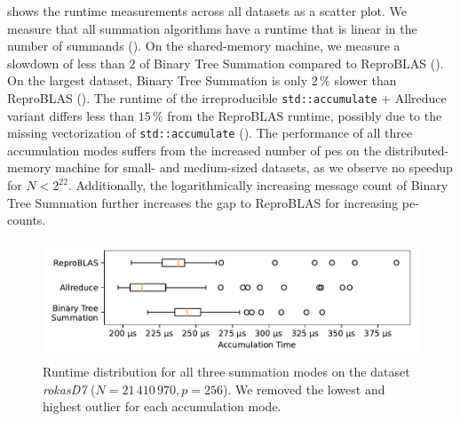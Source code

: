  shows the runtime measurements across all datasets as a scatter plot.
We measure that all summation algorithms have a runtime that is linear in the number of summands ().
On the shared-memory machine, we measure a slowdown of less than $2$ of Binary Tree Summation compared to ReproBLAS ().
On the largest dataset, Binary Tree Summation is only $2\,\%$ slower than ReproBLAS ().
The runtime of the irreproducible \texttt{std::accumulate} + Allreduce variant differs less than $15\,\%$ from the ReproBLAS runtime, possibly due to the missing vectorization of \texttt{std::accumulate} ().
The performance of all three accumulation modes suffers from the increased number of \glspl{pe} on the distributed-memory machine for small- and medium-sized datasets, as we observe no speedup for $N < 2^{22}$.
Additionally, the logarithmically increasing message count of Binary Tree Summation further increases the gap to ReproBLAS for increasing \gls{pe}-counts.\@

\begin{figure}
\centering
\includegraphics[scale=0.75]{figures/boxplotRokasD7.pdf}
\caption[Runtime distribution for all three summation modes on the dataset \textit{rokasD7}.]{Runtime distribution for all three summation modes on the dataset \textit{rokasD7} ($N = 21\,410\,970, p = 256$). We removed the lowest and highest outlier for each accumulation mode.}
\label{fig:boxplotRokasD7}
\end{figure}


